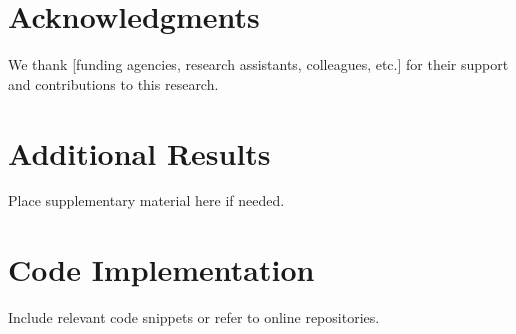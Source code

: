\documentclass[a4paper, 12pt, oneside]{article}
\theoremstyle{definition}
\theoremstyle{remark}
\begin{document}
\section*{Acknowledgments}
We thank [funding agencies, research assistants, colleagues, etc.] for their support and contributions to this research.

\printbibliography[heading=bibintoc, title=References]

\begin{appendices}
\section{Additional Results}
\label{app:additional}

Place supplementary material here if needed.

\section{Code Implementation}
\label{app:code}

Include relevant code snippets or refer to online repositories.

\end{appendices}
\end{document}
